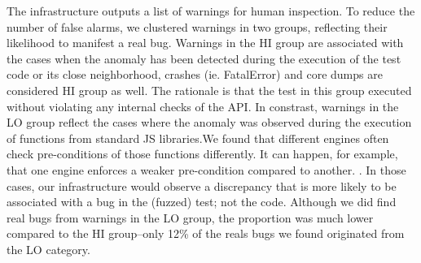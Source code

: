\documentclass[10pt,conference,anonymous]{IEEEtran}
\begin{document}
The infrastructure outputs a list of warnings for human inspection.
To reduce the number of false alarms, we clustered warnings in two
groups, reflecting their likelihood to manifest a real bug. Warnings
in the HI group are associated with the cases when the anomaly has been
detected during the execution of the test code or its close neighborhood, crashes (ie. FatalError) and core dumps 
  are considered HI group as well. The rationale is that
the test in this group executed without violating any internal checks
of the API. In constrast, warnings in the LO group reflect the cases where the
anomaly was observed during the execution of functions from standard JS
libraries.We
found that different engines often check pre-conditions of those
functions differently. It can happen, for example, that one engine
enforces a weaker pre-condition compared to another.
.
In those cases,
our infrastructure would observe a discrepancy that is more likely to
be associated with a bug in the (fuzzed) test; not the code. Although
we did find real bugs from warnings in the LO group, the proportion
was much lower compared to the HI group--only 12\% of the reals bugs
we found originated from the LO category. 





\end{document}
